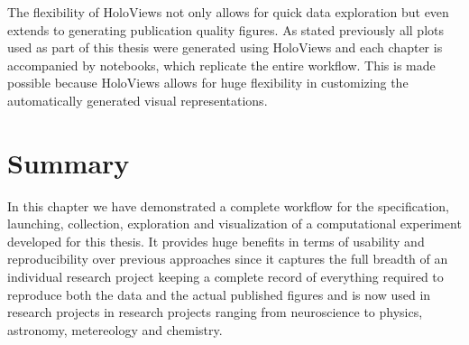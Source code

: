 The flexibility of HoloViews not only allows for quick data
exploration but even extends to generating publication quality
figures. As stated previously all plots used as part of this thesis
were generated using HoloViews and each chapter is accompanied by
notebooks, which replicate the entire workflow. This is made possible
because HoloViews allows for huge flexibility in customizing the
automatically generated visual representations.

\section{Summary}

In this chapter we have demonstrated a complete workflow for the
specification, launching, collection, exploration and visualization of
a computational experiment developed for this thesis. It provides huge
benefits in terms of usability and reproducibility over previous
approaches since it captures the full breadth of an individual
research project keeping a complete record of everything required to
reproduce both the data and the actual published figures and is now
used in research projects in research projects ranging from
neuroscience to physics, astronomy, metereology and chemistry.
